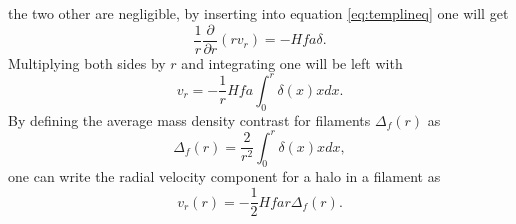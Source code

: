 the two other are negligible, by inserting into equation \ref{eq:templineq} one
will get
\begin{equation}
    \frac{1}{r}\frac{\partial}{\partial r}(rv_r)=-Hfa\delta.
\end{equation}
Multiplying both sides by $r$ and integrating one will be left with
\begin{equation}
    v_r=-\frac{1}{r}Hfa\int_0^r\delta(x) x dx.
\end{equation}
By defining the average mass density contrast for filaments $\Delta_f(r)$
as
\begin{equation}\label{eq:contrastfil}
    \Delta_f(r)=\frac{2}{r^2}\int_0^r\delta(x) x dx,
\end{equation}
one can write the radial velocity component for a halo in a filament as
\begin{equation}\label{eq:vrfilament}
    v_r(r) = -\frac{1}{2}Hfar\Delta_f(r).
\end{equation}
